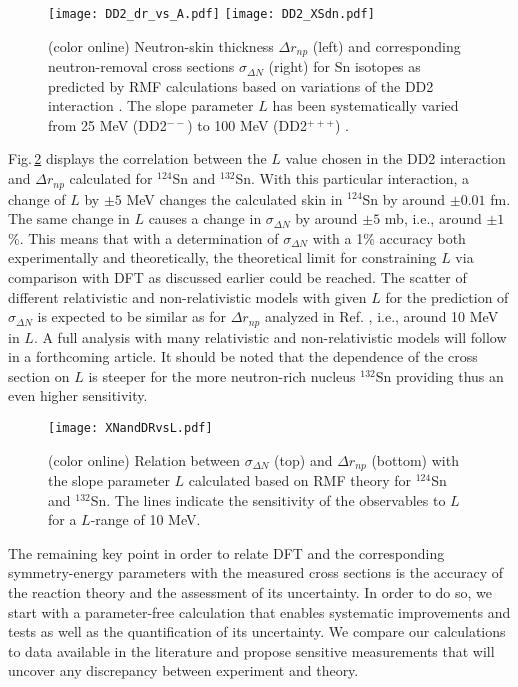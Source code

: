 \documentclass[english,aps,prl,twocolumn,superscriptaddress]{revtex4}
\begin{document}
\begin{figure}[t]
\texttt{[image: DD2\_dr\_vs\_A.pdf]}
\texttt{[image: DD2\_XSdn.pdf]}
\caption{(color online) Neutron-skin thickness $\Delta r_{np}$ (left) and corresponding neutron-removal cross sections $\sigma_{\Delta N}$ (right) for Sn isotopes as predicted by RMF calculations based on variations \cite{Typ14} of the DD2 interaction \cite{Typ10}. The slope parameter $L$ has been systematically varied from 25 MeV (DD2$^{--}$) to 100 MeV (DD2$^{+++}$) \cite{Typ14}. }
\label{fig2}
\end{figure}

Fig.\,\ref{fig3} displays the correlation between the $L$ value chosen in the DD2 interaction and $\Delta r_{np}$ calculated for $^{124}$Sn and $^{132}$Sn. With this particular interaction, a change of $L$ by $\pm 5$ MeV changes the calculated skin in $^{124}$Sn by around $\pm 0.01$ fm. The same change in $L$ causes a change in $\sigma_{\Delta N}$ by around $\pm 5$ mb, i.e., around $\pm 1$\%. This means that with a determination of $\sigma_{\Delta N}$ with a 1\% accuracy both experimentally and theoretically, the theoretical limit for constraining $L$ via comparison with DFT as discussed earlier could be reached. The scatter of different relativistic and non-relativistic models with given $L$ for the prediction of $\sigma_{\Delta N}$ is expected to be similar as for $\Delta r_{np}$ analyzed in Ref. \cite{Roc11}, i.e., around 10 MeV in $L$. A full analysis with many relativistic and non-relativistic models will follow in a forthcoming article. It should be noted that the dependence of the cross section on $L$ is steeper for the more neutron-rich nucleus $^{132}$Sn providing thus an even higher sensitivity. 

\begin{figure}[t]
\texttt{[image: XNandDRvsL.pdf]}
\caption{(color online) Relation between $\sigma_{\Delta N}$ (top) and $\Delta r_{np}$ (bottom) with the slope parameter $L$ calculated based on RMF theory for $^{124}$Sn and $^{132}$Sn. The lines indicate the sensitivity of the observables to $L$ for a $L$-range of 10 MeV.}
\label{fig3}
\end{figure}

The remaining key point in order to relate DFT and the corresponding symmetry-energy parameters with the measured cross sections is the accuracy of the reaction theory and the assessment of its uncertainty. In order to do so, we start with a parameter-free calculation that enables systematic improvements and tests as well as the quantification of its uncertainty. We compare our calculations to data available in the literature and propose sensitive measurements that will uncover any discrepancy between experiment and theory.
\end{document}
